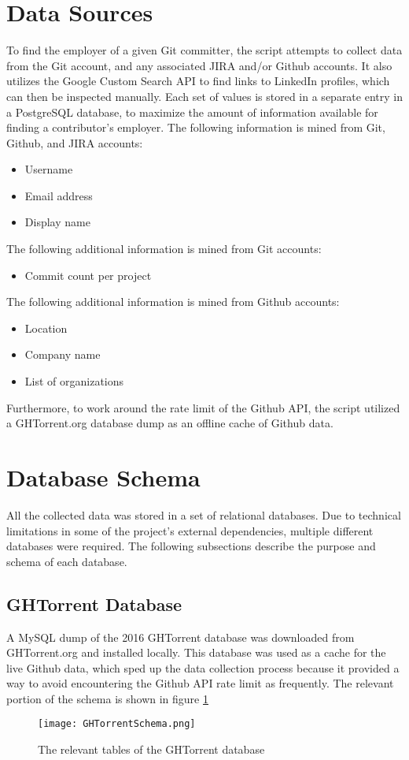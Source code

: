 \section{Data Sources}

To find the employer of a given Git committer, the script attempts to collect data from the Git account, and any associated JIRA and/or Github accounts. It also utilizes the Google Custom Search API to find links to LinkedIn profiles, which can then be inspected manually. Each set of values is stored in a separate entry in a PostgreSQL database, to maximize the amount of information available for finding a contributor's employer.
The following information is mined from Git, Github, and JIRA accounts:
\begin{itemize}
	\item Username
	\item Email address
	\item Display name
\end{itemize}
The following additional information is mined from Git accounts:
\begin{itemize}
	\item Commit count per project
\end{itemize}
The following additional information is mined from Github accounts:
\begin{itemize}
	\item Location
	\item Company name
	\item List of organizations
\end{itemize}
Furthermore, to work around the rate limit of the Github API, the script utilized a GHTorrent.org database dump as an offline cache of Github data.

 

\section{Database Schema}
All the collected data was stored in a set of relational databases. Due to technical limitations in some of the project's external dependencies, multiple different databases were required. The following subsections describe the purpose and schema of each database.
\subsection{GHTorrent Database}
A MySQL dump of the 2016 GHTorrent database was downloaded from GHTorrent.org and installed locally. This database was used as a cache for the live Github data, which sped up the data collection process because it provided a way to avoid encountering the Github API rate limit as frequently. The relevant portion of the schema is shown in figure \ref{fig:ghtorrentSchema}
\begin{figure}
	\texttt{[image: GHTorrentSchema.png]}
	\centering
	\caption{The relevant tables of the GHTorrent database}
	\label{fig:ghtorrentSchema}
\end{figure}
